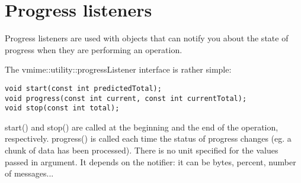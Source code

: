 \section{Progress listeners}

Progress listeners are used with objects that can notify you about the state
of progress when they are performing an operation.

The {\vcode vmime::utility::progressListener} interface is rather simple:

\begin{lstlisting}
void start(const int predictedTotal);
void progress(const int current, const int currentTotal);
void stop(const int total);
\end{lstlisting}

{\vcode start()} and {\vcode stop()} are called at the beginning and the end
of the operation, respectively. {\vcode progress()} is called each time the
status of progress changes (eg. a chunk of data has been processed). There is
no unit specified for the values passed in argument. It depends on the
notifier: it can be bytes, percent, number of messages...
